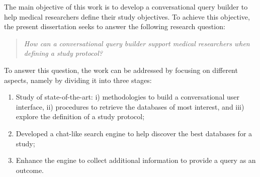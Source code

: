 The main objective of this work is to develop a conversational query builder to help medical researchers define their study objectives. To achieve this objective, the present dissertation seeks to answer the following research question:

\begin{quote}
    \small\textit{How can a conversational query builder support medical researchers when defining a study protocol?}
\end{quote}

To answer this question, the work can be addressed by focusing on different aspects, namely by dividing it into three stages:


\begin{enumerate}
    \item Study of state-of-the-art: i) methodologies to build a conversational user interface, ii) procedures to retrieve the databases of most interest, and iii) explore the definition of a study protocol;
    \item Developed a chat-like search engine to help discover the best databases for a study;
    \item Enhance the engine to collect additional information to provide a query as an outcome. 
\end{enumerate}






